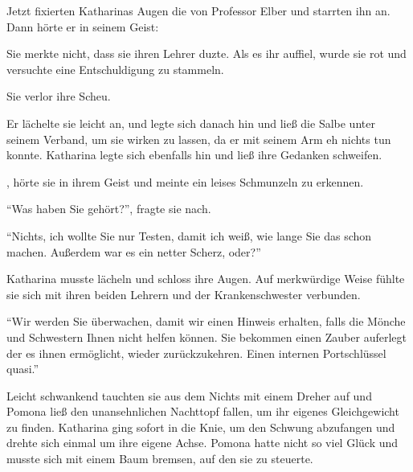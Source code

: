 Jetzt fixierten Katharinas Augen die von Professor Elber und starrten ihn an. Dann hörte er in seinem Geist: 


 Sie merkte nicht, dass sie ihren Lehrer duzte. Als es ihr auffiel, wurde sie rot und versuchte eine Entschuldigung zu stammeln.


 Sie verlor ihre Scheu. 

Er lächelte sie leicht an, und legte sich danach hin und ließ die Salbe unter seinem Verband, um sie wirken zu lassen, da er mit seinem Arm eh nichts tun konnte. Katharina legte sich ebenfalls hin und ließ ihre Gedanken schweifen.

, hörte sie in ihrem Geist und meinte ein leises Schmunzeln zu erkennen.

\enquote{Was haben Sie gehört?}, fragte sie nach.

\enquote{Nichts, ich wollte Sie nur Testen, damit ich weiß, wie lange Sie das schon machen. Außerdem war es ein netter Scherz, oder?}

Katharina musste lächeln und schloss ihre Augen. Auf merkwürdige Weise fühlte sie sich mit ihren beiden Lehrern und der Krankenschwester verbunden.

\enquote{Wir werden Sie überwachen, damit wir einen Hinweis erhalten, falls die Mönche und Schwestern Ihnen nicht helfen können. Sie bekommen einen Zauber auferlegt der es ihnen ermöglicht, wieder zurückzukehren. Einen internen Portschlüssel quasi.}

\trenn

Leicht schwankend tauchten sie aus dem Nichts mit einem Dreher auf und Pomona ließ den unansehnlichen Nachttopf fallen, um ihr eigenes Gleichgewicht zu finden. Katharina ging sofort in die Knie, um den Schwung abzufangen und drehte sich einmal um ihre eigene Achse. Pomona hatte nicht so viel Glück und musste sich mit einem Baum bremsen, auf den sie zu steuerte.

